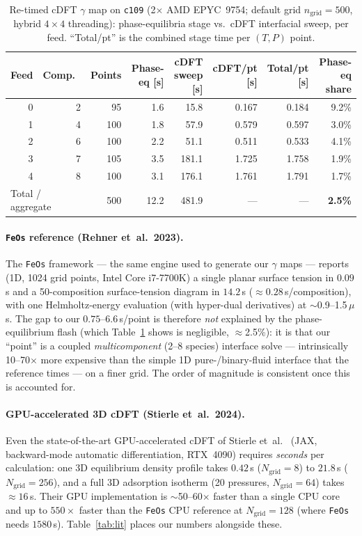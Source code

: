 \documentclass[11pt]{article}
\begin{document}
\begin{table}[t]
\centering
\caption{Re-timed cDFT $\gamma$ map on \texttt{c109} (2$\times$ AMD EPYC~9754;
default grid $n_\mathrm{grid}=500$, hybrid $4\times4$ threading):
phase-equilibria stage vs.\ cDFT interfacial sweep, per feed. ``Total/pt'' is the
combined stage time per $(T,P)$ point.}
\label{tab:stage}
\small
\begin{tabular}{rrrrrrrr}
\toprule
Feed & Comp.\ & Points & Phase-eq [s] & cDFT sweep [s] & cDFT/pt [s] & Total/pt [s] & Phase-eq share \\
\midrule
0 & 2 & 95  & 1.6 & 15.8  & 0.167 & 0.184 & 9.2\% \\
1 & 4 & 100 & 1.8 & 57.9  & 0.579 & 0.597 & 3.0\% \\
2 & 6 & 100 & 2.2 & 51.1  & 0.511 & 0.533 & 4.1\% \\
3 & 7 & 105 & 3.5 & 181.1 & 1.725 & 1.758 & 1.9\% \\
4 & 8 & 100 & 3.1 & 176.1 & 1.761 & 1.791 & 1.7\% \\
\midrule
\multicolumn{2}{l}{Total / aggregate} & 500 & 12.2 & 481.9 & --- & --- & \textbf{2.5\%} \\
\bottomrule
\end{tabular}
\end{table}

\paragraph{\texttt{FeOs} reference (Rehner et~al.\ 2023).}
The \texttt{FeOs} framework \cite{rehner2023feos} --- the same engine used to
generate our $\gamma$ maps --- reports (1D, 1024 grid points, Intel Core
i7-7700K) a single planar surface tension in $0.09$\,s and a 50-composition
surface-tension diagram in $14.2$\,s ($\approx0.28$\,s/composition), with one
Helmholtz-energy evaluation (with hyper-dual derivatives) at $\sim$0.9--1.5\,$\mu$s.
The gap to our $0.75$--$6.6$\,s/point is therefore \emph{not} explained by the
phase-equilibrium flash (which Table~\ref{tab:stage} shows is negligible,
$\approx$2.5\%): it is that our ``point'' is a coupled \emph{multicomponent}
(2--8 species) interface solve --- intrinsically 10--70$\times$ more expensive
than the simple 1D pure-/binary-fluid interface that the reference times --- on
a finer grid. The order of magnitude is consistent once this is accounted for.

\paragraph{GPU-accelerated 3D cDFT (Stierle et~al.\ 2024).}
Even the state-of-the-art GPU-accelerated cDFT of Stierle et~al.\
\cite{stierle2024gpu} (JAX, backward-mode automatic differentiation, RTX~4090)
requires \emph{seconds} per calculation: one 3D equilibrium density profile takes
$0.42$\,s ($N_\mathrm{grid}=8$) to $21.8$\,s ($N_\mathrm{grid}=256$), and a full
3D adsorption isotherm (20 pressures, $N_\mathrm{grid}=64$) takes $\approx16$\,s.
Their GPU implementation is $\sim$50--60$\times$ faster than a single CPU core and
up to $550\times$ faster than the \texttt{FeOs} CPU reference at
$N_\mathrm{grid}=128$ (where \texttt{FeOs} needs $1580$\,s).
Table~\ref{tab:lit} places our numbers alongside these.
\end{document}
